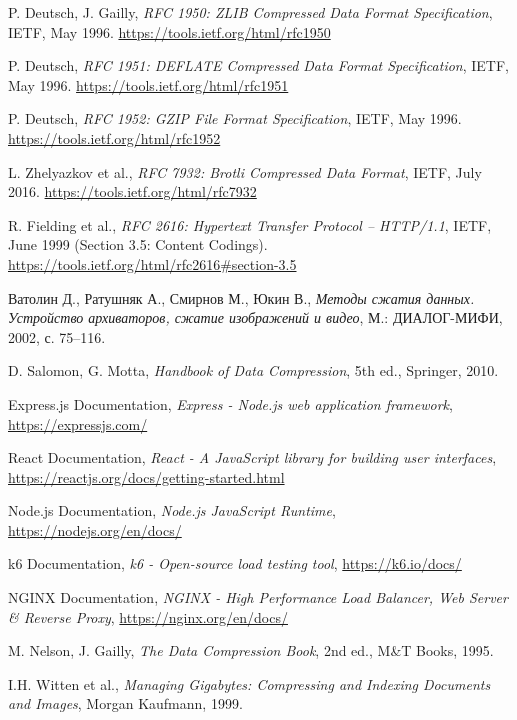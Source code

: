 \documentclass[12pt]{article}
\begin{document}
\begin{thebibliography}{9}
    P. Deutsch, J. Gailly,
    \textit{RFC 1950: ZLIB Compressed Data Format Specification},
    IETF, May 1996.
    \url{https://tools.ietf.org/html/rfc1950}

    P. Deutsch,
    \textit{RFC 1951: DEFLATE Compressed Data Format Specification},
    IETF, May 1996.
    \url{https://tools.ietf.org/html/rfc1951}

    P. Deutsch,
    \textit{RFC 1952: GZIP File Format Specification},
    IETF, May 1996.
    \url{https://tools.ietf.org/html/rfc1952}

    L. Zhelyazkov et al.,
    \textit{RFC 7932: Brotli Compressed Data Format},
    IETF, July 2016.
    \url{https://tools.ietf.org/html/rfc7932}

    R. Fielding et al.,
    \textit{RFC 2616: Hypertext Transfer Protocol -- HTTP/1.1},
    IETF, June 1999 (Section 3.5: Content Codings).
    \url{https://tools.ietf.org/html/rfc2616#section-3.5}

    Ватолин Д., Ратушняк А., Смирнов М., Юкин В.,
    \textit{Методы сжатия данных. Устройство архиваторов, сжатие изображений и видео},
    М.: ДИАЛОГ-МИФИ, 2002, с. 75--116.

    D. Salomon, G. Motta,
    \textit{Handbook of Data Compression},
    5th ed., Springer, 2010.

    Express.js Documentation,
    \textit{Express - Node.js web application framework},
    \url{https://expressjs.com/}

    React Documentation,
    \textit{React - A JavaScript library for building user interfaces},
    \url{https://reactjs.org/docs/getting-started.html}

    Node.js Documentation,
    \textit{Node.js JavaScript Runtime},
    \url{https://nodejs.org/en/docs/}

    k6 Documentation,
    \textit{k6 - Open-source load testing tool},
    \url{https://k6.io/docs/}

    NGINX Documentation,
    \textit{NGINX - High Performance Load Balancer, Web Server \& Reverse Proxy},
    \url{https://nginx.org/en/docs/}

    M. Nelson, J. Gailly,
    \textit{The Data Compression Book},
    2nd ed., M\&T Books, 1995.

    I.H. Witten et al.,
    \textit{Managing Gigabytes: Compressing and Indexing Documents and Images},
    Morgan Kaufmann, 1999.
\end{thebibliography}
\end{document}
